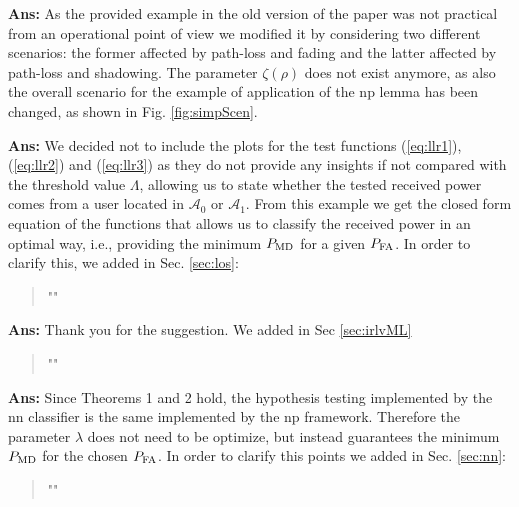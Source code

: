 \documentclass[draftcls,onecolumn,12pt]{IEEEtran}
\newcounter{revc}
\newcommand{\revp}[1]{\zref[revcontent]{#1}}
\begin{document}
{\bf Ans:} As the provided example in the old version of the paper was not practical from an operational point of view we modified it by considering two different scenarios: the former affected by path-loss and fading and the latter affected by path-loss and shadowing. The parameter $\zeta(\rho)$ does not exist anymore, as also the overall scenario for the example of application of the \ac{np} lemma has been changed, as shown in Fig. \ref{fig:simpScen}. 

\vspace{5mm} %
\begin{framed}
\end{framed}

{\bf Ans:} We decided not to include the plots for the test functions (\ref{eq:llr1}), (\ref{eq:llr2}) and (\ref{eq:llr3}) as they do not provide any insights if not compared with the threshold value $\Lambda$, allowing us to state whether the tested received power comes from a user located in $\mathcal{A}_0$ or $\mathcal{A}_1$. From this example we get the closed form equation of the functions that allows us to classify the received power in an optimal way, i.e., providing the minimum $P_{\rm MD}$ for a given $P_{\rm FA}$. In order to clarify this, we added in Sec. \ref{sec:los}:
\begin{quote}
"\revp{llrComp}"
\end{quote}

\vspace{5mm} %
\begin{framed}
\end{framed}

{\bf Ans:} Thank you for the suggestion. We added in Sec \ref{sec:irlvML}
\begin{quote}
"\revp{supervised}"
\end{quote}

\vspace{5mm} %
\begin{framed}
\end{framed}

{\bf Ans:} Since Theorems 1 and 2 hold, the hypothesis testing implemented by the \ac{nn} classifier is the same implemented by the \ac{np} framework. Therefore the parameter $\lambda$ does not need to be optimize, but instead guarantees the minimum $P_{\rm MD}$ for the chosen $P_{\rm FA}$. In order to clarify this points we added in Sec. \ref{sec:nn}:
\begin{quote}
"\revp{lambdaNN}"
\end{quote}
\end{document}
